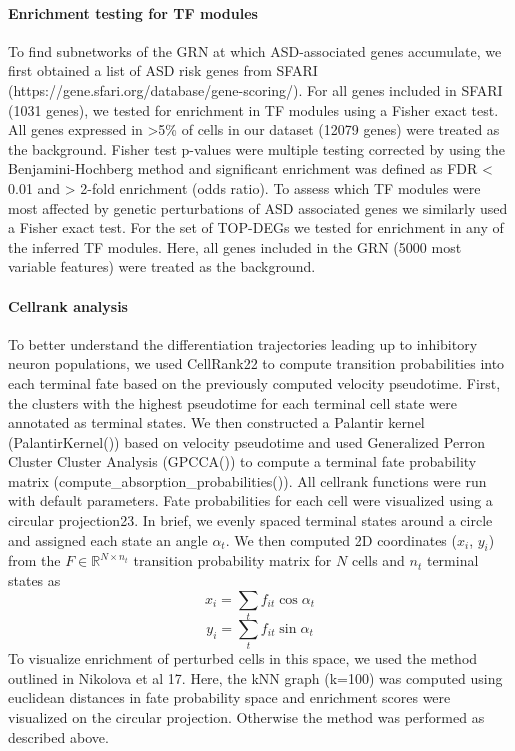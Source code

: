 \paragraph{Enrichment testing for TF modules}
To find subnetworks of the GRN at which ASD-associated genes accumulate, we first obtained a list of ASD risk genes from SFARI \\(https://gene.sfari.org/database/gene-scoring/). For all genes included in SFARI (1031 genes), we tested for enrichment in TF modules using a Fisher exact test. All genes expressed in >5\% of cells in our dataset (12079 genes) were treated as the background. Fisher test p-values were multiple testing corrected by using the Benjamini-Hochberg method and significant enrichment was defined as FDR < 0.01 and > 2-fold enrichment (odds ratio). To assess which TF modules were most affected by genetic perturbations of ASD associated genes we similarly used a Fisher exact test. For the set of TOP-DEGs we tested for enrichment in any of the inferred TF modules. Here, all genes included in the GRN (5000 most variable features) were treated as the background.  

\paragraph{Cellrank analysis}
To better understand the differentiation trajectories leading up to inhibitory neuron populations, we used CellRank22 to compute transition probabilities into each terminal fate based on the previously computed velocity pseudotime. First, the clusters with the highest pseudotime for each terminal cell state were annotated as terminal states. We then constructed a Palantir kernel (PalantirKernel()) based on velocity pseudotime and used Generalized Perron Cluster Cluster Analysis (GPCCA()) to compute a terminal fate probability matrix (compute\_absorption\_probabilities()). All cellrank functions were run with default parameters. Fate probabilities for each cell were visualized using a circular projection23. In brief, we evenly spaced terminal states around a circle and assigned each state an angle $\alpha_t$. We then computed 2D coordinates ($x_i$, $y_i$) from the $F \in \mathbb{R}^{N\times n_t}$  transition probability matrix for $N$ cells and $n_t$  terminal states as 
\[x_i = \sum_t f_{it} \cos \alpha_t\]
\[y_i = \sum_t f_{it} \sin \alpha_t\]
To visualize enrichment of perturbed cells in this space, we used the method outlined in Nikolova et al 17.  Here, the kNN graph (k=100) was computed using euclidean distances in fate probability space and enrichment scores were visualized on the circular projection. Otherwise the method was performed as described above.

